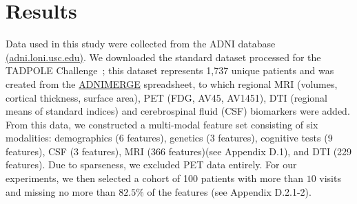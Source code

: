 \documentclass{article}
\newcommand{\vect}[1]{\boldsymbol{#1}}
\def\eg{\emph{e.g}.}
\begin{document}



\section{Results}

Data used in this study were collected from the ADNI database \href{http://adni.loni.usc.edu/}{(adni.loni.usc.edu)}. We downloaded the standard dataset processed for the TADPOLE Challenge~\citep{tadpole2017}; this dataset represents 1,737 unique patients and was created from the \href{https://adni.bitbucket.io/index.html}{ADNIMERGE} spreadsheet, to which regional MRI (volumes, cortical thickness, surface area), PET (FDG, AV45, AV1451), DTI (regional means of standard indices) and cerebrospinal fluid (CSF) biomarkers were added. From this data, we constructed a multi-modal feature set consisting of six modalities: demographics (6 features), genetics (3 features), cognitive tests (9 features), CSF (3 features), MRI (366 features)(see Appendix D.1), and DTI (229 features). Due to sparseness, we excluded PET data entirely. For our experiments, we then selected a cohort of 100 patients with more than $10$ visits and missing no more than $82.5\%$ of the features (see Appendix D.2.1-2).
\end{document}
